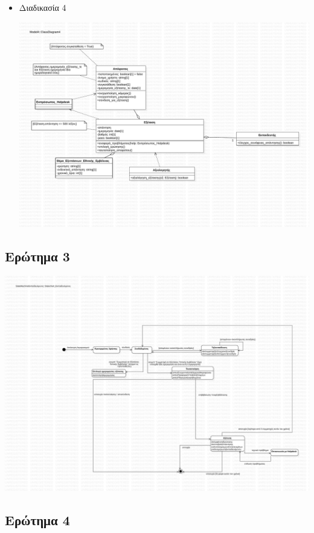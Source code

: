 \documentclass[a4paper, titlepage, twoside]{article}
\begin{document}
\begin{itemize}
\begin{center}
\end{center}
\item Διαδικασία 4
\label{sec:orgfa1d02e}
\begin{center}
\includegraphics[width=.9\linewidth]{class_4.pdf}
\end{center}
\end{itemize}

\subsection{Ερώτημα 3}
\label{sec:org61d701c}

\begin{center}
\includegraphics[width=.9\linewidth]{state.pdf}
\end{center}

\subsection{Ερώτημα 4}
\label{sec:org89c2962}
\end{document}
